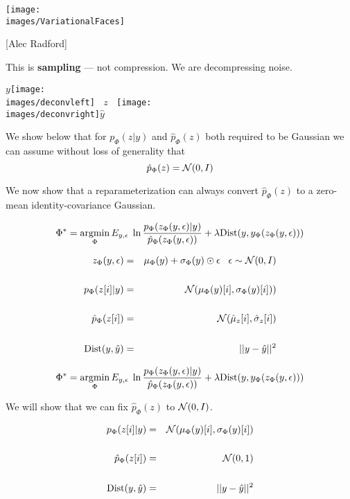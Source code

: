 {{\vfill
\centerline{\texttt{[image: \\images/VariationalFaces]}}
\centerline{[Alec Radford]}

\vfill
This is {\bf sampling} --- not compression.  We are decompressing noise.



\bigskip
\centerline{$y$\texttt{[image: \\images/deconvleft]} $\;\;z\;\;$ \texttt{[image: \\images/deconvright]}$\hat{y}$}

\bigskip
\bigskip
We show below that for $p_\Phi(z|y)$ and $\hat{p}_\Phi(z)$ both required to be Gaussian we can assume without loss
of generality that
\bigskip
$$\hat{p}_\Phi(z) = {\cal N}(0,I)$$


We now show that a reparameterization can always convert $\hat{p}_\Phi(z)$ to a zero-mean identity-covariance Gaussian.

\vfill
$$\Phi^* = \operatorname*{argmin}_\Phi E_{y,\epsilon}\;\ln \frac{p_\Phi(z_\Phi(y,\epsilon)|y)}{\hat{p}_\Phi(z_\Phi(y,\epsilon))} + \lambda \mathrm{Dist}(y,y_\Phi(z_\Phi(y,\epsilon)))$$

{\color{red}
\begin{eqnarray*}
z_\Phi(y,\epsilon) & = & \mu_\Phi(y) + \sigma_\Phi(y) \odot \epsilon\;\;\;\epsilon \sim {\cal N}(0,I) \\
\\
p_\Phi(z[i]|y) & = & {\cal N}(\mu_\Phi(y)[i],\sigma_\Phi(y)[i])) \\
\\
\hat{p}_\Phi(z[i]) & = & {\cal N}(\hat{\mu}_z[i],\hat{\sigma}_z[i]) \\
\\
\mathrm{Dist}(y,\hat{y}) & = & ||y-\hat{y}||^2
\end{eqnarray*}
}


$$\Phi^* = \operatorname*{argmin}_\Phi E_{y,\epsilon}\;\ln \frac{p_\Phi(z_\Phi(y,\epsilon)|y)}{\hat{p}_\Phi(z_\Phi(y,\epsilon))} + \lambda \mathrm{Dist}(y,y_\Phi(z_\Phi(y,\epsilon)))$$

\vfill
We will show that we can fix $\hat{p}_\Phi(z)$ to ${\cal N}(0,I)$.

{\color{red}
\begin{eqnarray*}
p_\Phi(z[i]|y) & = & {\cal N}(\mu_\Phi(y)[i],\sigma_\Phi(y)[i]) \\
\\
\hat{p}_\Phi(z[i]) & = & {\cal N}(0,1) \\
\\
\mathrm{Dist}(y,\hat{y}) & = & ||y-\hat{y}||^2
\end{eqnarray*}
}


}}
